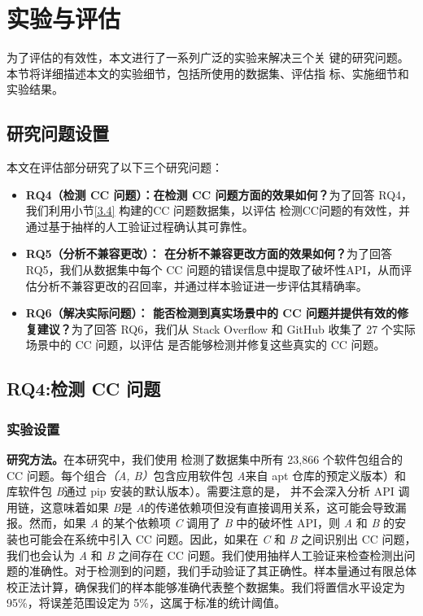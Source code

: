 \chapter{实验与评估}
为了评估\tool{}的有效性，本文进行了一系列广泛的实验来解决三个关
键的研究问题。本节将详细描述本文的实验细节，包括所使用的数据集、评估指
标、实施细节和实验结果。

\section{研究问题设置}
本文在评估部分研究了以下三个研究问题：
\begin{itemize}
	\item \textbf{RQ4（检测 CC 问题）：\tool{}在检测 CC 问题方面的效果如何？}为了回答 RQ4，我们利用小节\ref{3.4} 构建的CC 问题数据集，以评估\tool{} 检测CC问题的有效性，并通过基于抽样的人工验证过程确认其可靠性。
	\item \textbf{RQ5（分析不兼容更改）：\tool{} 在分析不兼容更改方面的效果如何？}为了回答 RQ5，我们从数据集中每个 CC 问题的错误信息中提取了破坏性API，从而评估分析不兼容更改的召回率，并通过样本验证进一步评估其精确率。
	\item \textbf{RQ6（解决实际问题）：\tool{} 能否检测到真实场景中的 CC 问题并提供有效的修复建议？}为了回答 RQ6，我们从 Stack Overflow 和 GitHub 收集了 27 个实际场景中的 CC 问题，以评估 \tool{} 是否能够检测并修复这些真实的 CC 问题。
\end{itemize}

\section{RQ4:检测 CC 问题}
\subsection{实验设置}
\textbf{研究方法。}在本研究中，我们使用 \tool{} 检测了数据集中所有 23,866 个软件包组合的 CC 问题。每个组合\textit{（A, B）}包含应用软件包 \textit{A}来自 apt 仓库的预定义版本）和库软件包 \textit{B}通过 pip 安装的默认版本）。需要注意的是， \tool{} 并不会深入分析 API 调用链，这意味着如果 \textit{B}是 \textit{A}的传递依赖项但没有直接调用关系，这可能会导致漏报。然而，如果 \textit{A} 的某个依赖项 \textit{C} 调用了 \textit{B} 中的破坏性 API，则 \textit{A} 和 \textit{B} 的安装也可能会在系统中引入 CC 问题。因此，如果在 \textit{C} 和 \textit{B} 之间识别出 CC 问题，我们也会认为 \textit{A} 和 \textit{B} 之间存在 CC 问题。我们使用抽样人工验证来检查检测出问题的准确性。对于检测到的问题，我们手动验证了其正确性。样本量通过有限总体校正法计算，确保我们的样本能够准确代表整个数据集。我们将置信水平设定为 95\%，将误差范围设定为 5\%，这属于标准的统计阈值。

